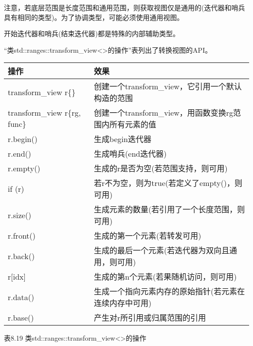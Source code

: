 注意，若底层范围是长度范围和通用范围，则获取视图仅是通用的(迭代器和哨兵具有相同的类型)。为了协调类型，可能必须使用通用视图。

开始迭代器和哨兵(结束迭代器)都是特殊的内部辅助类型。


“类std::ranges::transform\_view<>的操作”表列出了转换视图的API。

\begin{longtable}[c]{|l|l|}
\hline
\textbf{操作} & \textbf{效果}                                                \\ \hline
\endfirsthead
%
\endhead
%
transform\_view r\{\}         & 创建一个transform\_view，它引用一个默认构造的范围                               \\ \hline
transform\_view r\{rg, func\} & 创建一个transform\_view，用函数变换rg范围内所有元素的值          \\ \hline
r.begin()          & 生成begin迭代器                                      \\ \hline
r.end()            & 生成哨兵(end迭代器)                             \\ \hline
r.empty()          & 生成的r是否为空(若范围支持，则可用) \\ \hline
if (r)             & 若r不为空，则为true(若定义了empty()，则可用)         \\ \hline
r.size()           & 生成元素的数量(若引用了一个长度范围，则可用)                            \\ \hline
r.front()          & 生成的第一个元素(若转发可用)              \\ \hline
r.back()           & 生成的最后一个元素(若迭代器为双向且通用，则可用) \\ \hline
r{[}idx{]}         & 生成的第n个元素(若果随机访问，则可用)            \\ \hline
r.data()           & 生成一个指向元素内存的原始指针(若元素在连续内存中可用) \\ \hline
r.base()           & 产生对r所引用或归属范围的引用       \\ \hline
\end{longtable}

\begin{center}
表8.19 类std::ranges::transform\_view<>的操作
\end{center}

